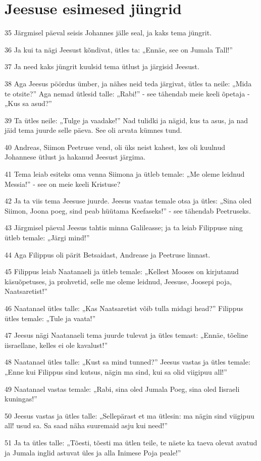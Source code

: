 \section*{Jeesuse esimesed jüngrid}

\par 35 Järgmisel päeval seisis Johannes jälle seal, ja kaks tema jüngrit.
\par 36 Ja kui ta nägi Jeesust kõndivat, ütles ta: „Ennäe, see on Jumala Tall!”
\par 37 Ja need kaks jüngrit kuulsid tema ütlust ja järgisid Jeesust.
\par 38 Aga Jeesus pöördus ümber, ja nähes neid teda järgivat, ütles ta neile: „Mida te otsite?” Aga nemad ütlesid talle: „Rabi!” - see tähendab meie keeli õpetaja - „Kus sa asud?”
\par 39 Ta ütles neile: „Tulge ja vaadake!” Nad tulidki ja nägid, kus ta asus, ja nad jäid tema juurde selle päeva. See oli arvata kümnes tund.
\par 40 Andreas, Siimon Peetruse vend, oli üks neist kahest, kes oli kuulnud Johannese ütlust ja hakanud Jeesust järgima.
\par 41 Tema leiab esiteks oma venna Siimona ja ütleb temale: „Me oleme leidnud Messia!” - see on meie keeli Kristuse?
\par 42 Ja ta viis tema Jeesuse juurde. Jeesus vaatas temale otsa ja ütles: „Sina oled Siimon, Joona poeg, sind peab hüütama Keefaseks!” - see tähendab Peetruseks.
\par 43 Järgmisel päeval Jeesus tahtis minna Galileasse; ja ta leiab Filippuse ning ütleb temale: „Järgi mind!”
\par 44 Aga Filippus oli pärit Betsaidast, Andrease ja Peetruse linnast.
\par 45 Filippus leiab Naatanaeli ja ütleb temale: „Kellest Mooses on kirjutanud käsuõpetuses, ja prohvetid, selle me oleme leidnud, Jeesuse, Joosepi poja, Naatsaretist!”
\par 46 Naatanael ütles talle: „Kas Naatsaretist võib tulla midagi head?” Filippus ütles temale: „Tule ja vaata!”
\par 47 Jeesus nägi Naatanaeli tema juurde tulevat ja ütles temast: „Ennäe, tõeline iisraellane, kelles ei ole kavalust!”
\par 48 Naatanael ütles talle: „Kust sa mind tunned?” Jeesus vastas ja ütles temale: „Enne kui Filippus sind kutsus, nägin ma sind, kui sa olid viigipuu all!”
\par 49 Naatanael vastas temale: „Rabi, sina oled Jumala Poeg, sina oled Iisraeli kuningas!”
\par 50 Jeesus vastas ja ütles talle: „Sellepärast et ma ütlesin: ma nägin sind viigipuu all! usud sa. Sa saad näha suuremaid asju kui need!”
\par 51 Ja ta ütles talle: „Tõesti, tõesti ma ütlen teile, te näete ka taeva olevat avatud ja Jumala inglid astuvat üles ja alla Inimese Poja peale!”


